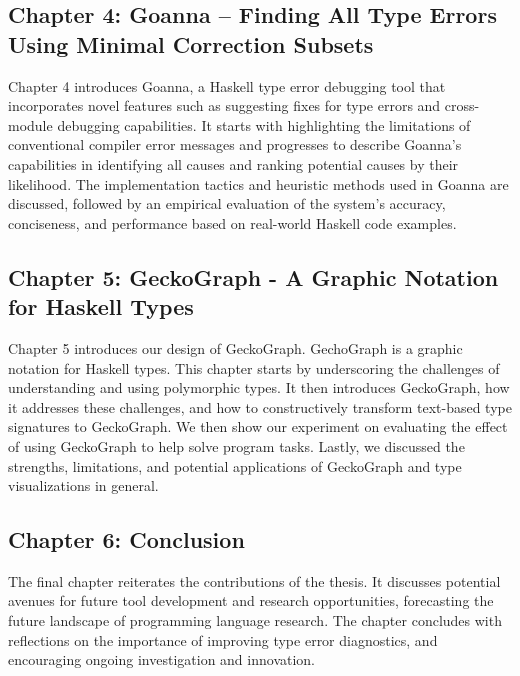 \subsection*{Chapter 4: Goanna -- Finding All Type Errors Using Minimal Correction Subsets}
Chapter 4 introduces Goanna, a Haskell type error debugging tool that incorporates novel features such as suggesting fixes for type errors and cross-module debugging capabilities. It starts with highlighting the limitations of conventional compiler error messages and progresses to describe Goanna's capabilities in identifying all causes and ranking potential causes by their likelihood. The implementation tactics and heuristic methods used in Goanna are discussed, followed by an empirical evaluation of the system's accuracy, conciseness, and performance based on real-world Haskell code examples.
    
\subsection*{Chapter 5: GeckoGraph - A Graphic Notation for Haskell Types}
Chapter 5 introduces our design of GeckoGraph. GechoGraph is a graphic notation for Haskell types. This chapter starts by underscoring the challenges of understanding and using polymorphic types. It then introduces GeckoGraph, how it addresses these challenges, and how to constructively transform text-based type signatures to GeckoGraph. We then show our experiment on evaluating the effect of using GeckoGraph to help solve program tasks. Lastly, we discussed the strengths, limitations, and potential applications of GeckoGraph and type visualizations in general.   
    
\subsection*{Chapter 6: Conclusion}
The final chapter reiterates the contributions of the thesis. It discusses potential avenues for future tool development and research opportunities, forecasting the future landscape of programming language research. The chapter concludes with reflections on the importance of improving type error diagnostics, and encouraging ongoing investigation and innovation.
